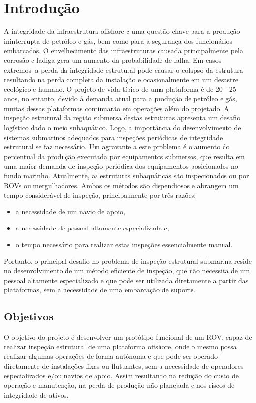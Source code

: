 \chapter{Introdução}
A integridade da infraestrutura offshore é uma questão-chave para a produção ininterrupta de petróleo e gás, bem como para a segurança dos funcionários embarcados. O envelhecimento das infraestruturas causada principalmente pela corrosão e fadiga gera um aumento da probabilidade de falha. Em casos extremos, a perda da integridade estrutural pode causar o colapso da estrutura resultando na perda completa da instalação e ocasionalmente em um desastre ecológico e humano. 
O projeto de vida típico de uma plataforma é de 20 - 25 anos, no entanto, devido à demanda atual para a produção de petróleo e gás, muitas dessas plataformas continuarão em operações além do projetado. A inspeção estrutural da região submersa destas estruturas apresenta um desafio logístico dado o meio subaquático. Logo, a importância do desenvolvimento de sistemas submarinos adequados para inspeções periódicas de integridade estrutural se faz necessário. Um agravante a este problema é o aumento do percentual da produção executada por equipamentos submersos, que resulta em uma maior demanda de inspeção periódica dos equipamentos posicionados no fundo marinho.  
Atualmente, as estruturas subaquáticas são inspecionados ou por ROVs ou mergulhadores. Ambos os métodos são dispendiosos e abrangem um tempo considerável de inspeção, principalmente por três razões: 
\begin{itemize}
	\item a necessidade de um navio de apoio,
	\item a necessidade de pessoal altamente especializado e,
	\item o tempo necessário para realizar estas inspeções essencialmente manual.
\end{itemize}

Portanto, o principal desafio no problema de inspeção estrutural submarina reside no desenvolvimento de um método eficiente de inspeção, que não necessita de um pessoal altamente especializado e que pode ser utilizada diretamente a partir das plataformas, sem a necessidade de uma embarcação de suporte.  

\section{Objetivos}
O objetivo do projeto é desenvolver um protótipo funcional de um ROV, capaz de realizar inspeção estrutural de uma plataforma offshore, onde o mesmo possa realizar algumas operações de forma autônoma e que pode ser operado diretamente de instalações fixas ou flutuantes, sem a necessidade de operadores especializados e/ou navios de apoio. Assim resultando na redução do custo de operação e manutenção, na perda de produção não planejada e nos riscos de integridade de ativos. 

